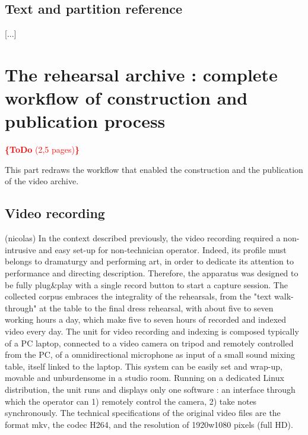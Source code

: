 \documentclass[conference]{IEEEtran}
\newcommand{\todo}[1]{\noindent\textcolor{red}{{\bf \{ToDo} #1{\bf \}}}}
\begin{document}
\subsection{Text and partition reference}
[...]



\section{The rehearsal archive : complete workflow of construction and publication process}
\todo{(2,5 pages)}

This part redraws the workflow that enabled the construction and the publication of the video archive.


\subsection{Video recording}  (nicolas)
In the context described previously, the video recording required a non-intrusive and easy set-up for non-technician operator. Indeed, its profile must belongs to dramaturgy and performing art, in order to dedicate its attention to performance and directing description. Therefore, the apparatus was designed to be fully plug\&play with a single record button to start a capture session.
The collected corpus embraces the integrality of the rehearsals, from the "text walk-through" at the table to the final dress rehearsal, with about five to seven working hours a day, which make five to seven hours of recorded and indexed video every day.
The unit for video recording and indexing is composed typically of a PC laptop, connected to a video camera on tripod and remotely controlled from the PC, of a omnidirectional microphone as input of a small sound mixing table, itself linked to the laptop. This system can be easily set and wrap-up, movable and unburdensome in a studio room. Running on a dedicated Linux distribution, the unit runs and displays only one software : an interface through which the operator can 1) remotely control the camera, 2) take notes synchronously. 
The technical specifications of the original video files are the format mkv, the codec H264, and the resolution of 1920w1080 pixels (full HD).
\end{document}
